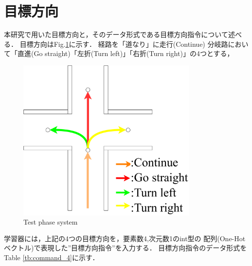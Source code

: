\section{目標方向}
本研究で用いた目標方向と，そのデータ形式である目標方向指令について述べる．
目標方向はFig.\ref{fig::cmd_4}に示す．
経路を「道なり」に走行(Continue)
分岐路において「直進(Go straight)「左折(Turn left)」「右折(Turn right)」の4つとする，
\begin{figure}[h]
  \centering
  \includegraphics[width = 9cm]{./figs/cmd_4.pdf}
  \caption{Test phase system}
  \label{fig::cmd_4}
\end{figure}

学習器には，上記の4つの目標方向を，要素数4,次元数1のint型の
配列(One-Hot ベクトル)で表現した”目標方向指令”を入力する．
目標方向指令のデータ形式をTable \ref{tb:command_4}に示す．

